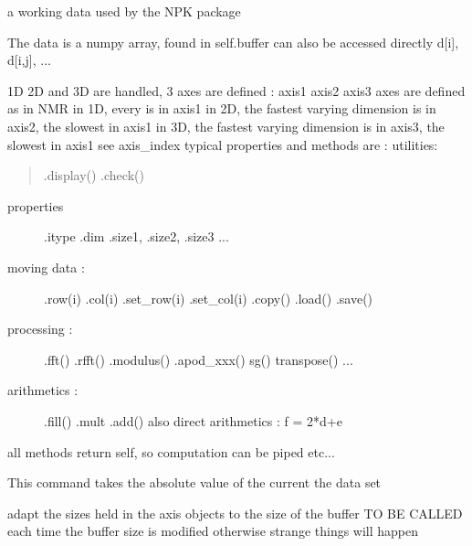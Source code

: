 \documentclass[letterpaper,10pt,openany,oneside]{sphinxmanual}
\begin{document}

\begin{fulllineitems}
\label{rst/code:NPKData.NPKData}
a working data used by the NPK package

The data is a numpy array, found in self.buffer     can also be accessed directly d{[}i{]}, d{[}i,j{]}, ...

1D 2D and 3D are handled, 3 axes are defined : axis1 axis2 axis3
axes are defined as in NMR
in 1D, every is in axis1
in 2D, the fastest varying dimension is in axis2, the slowest in axis1
in 3D, the fastest varying dimension is in axis3, the slowest in axis1
see axis\_index
typical properties and methods are :
utilities:
\begin{quote}

.display() 
.check()
\end{quote}
\begin{description}
\item[{properties}] \leavevmode
.itype
.dim .size1, .size2, .size3 ...

\item[{moving data :}] \leavevmode
.row(i) .col(i) .set\_row(i)  .set\_col(i)
.copy()
.load() .save()

\item[{processing :}] \leavevmode
.fft() .rfft() .modulus() .apod\_xxx()  sg()  transpose() ...

\item[{arithmetics :}] \leavevmode
.fill() .mult .add()
also direct arithmetics : f = 2*d+e

\end{description}

all methods return self, so computation can be piped
etc...

\begin{fulllineitems}
\label{rst/code:NPKData.NPKData.abs}
This command takes the absolute value of the current the data set

\end{fulllineitems}


\begin{fulllineitems}
\label{rst/code:NPKData.NPKData.adapt_size}
adapt the sizes held in the axis objects to the size of the buffer
TO BE CALLED each time the buffer size is modified
otherwise strange things will happen


\end{fulllineitems}
\end{fulllineitems}
\end{document}
